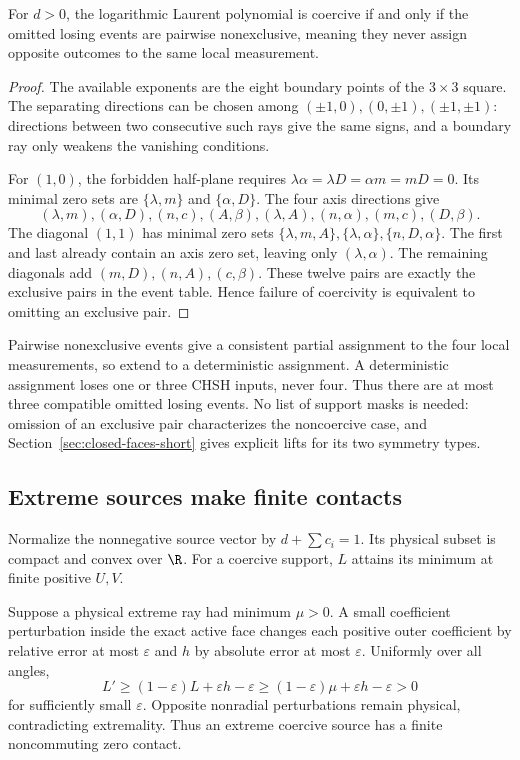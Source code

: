\begin{proposition}\label{prop:compat}
For $d>0$, the logarithmic Laurent polynomial is coercive if and only if the omitted losing events are pairwise nonexclusive, meaning they never assign opposite outcomes to the same local measurement.
\end{proposition}
\begin{proof}
The available exponents are the eight boundary points of the $3\times3$ square. The separating directions can be chosen among $(\pm1,0),(0,\pm1),(\pm1,\pm1)$: directions between two consecutive such rays give the same signs, and a boundary ray only weakens the vanishing conditions.

For $(1,0)$, the forbidden half-plane requires
$\lambda\alpha=\lambda D=\alpha m=mD=0$. Its minimal zero sets are $\{\lambda,m\}$ and $\{\alpha,D\}$. The four axis directions give
\[
(\lambda,m),(\alpha,D),(n,c),(A,\beta),
(\lambda,A),(n,\alpha),(m,c),(D,\beta).
\]
The diagonal $(1,1)$ has minimal zero sets
$\{\lambda,m,A\},\{\lambda,\alpha\},\{n,D,\alpha\}$.
The first and last already contain an axis zero set, leaving only $(\lambda,\alpha)$. The remaining diagonals add $(m,D),(n,A),(c,\beta)$. These twelve pairs are exactly the exclusive pairs in the event table. Hence failure of coercivity is equivalent to omitting an exclusive pair.
\end{proof}

Pairwise nonexclusive events give a consistent partial assignment to the four local measurements, so extend to a deterministic assignment. A deterministic assignment loses one or three CHSH inputs, never four. Thus there are at most three compatible omitted losing events. No list of support masks is needed: omission of an exclusive pair characterizes the noncoercive case, and Section~\ref{sec:closed-faces-short} gives explicit lifts for its two symmetry types.

\subsection{Extreme sources make finite contacts}
Normalize the nonnegative source vector by $d+\sum c_i=1$. Its physical subset is compact and convex over $\R$. For a coercive support, $L$ attains its minimum at finite positive $U,V$.

Suppose a physical extreme ray had minimum $\mu>0$. A small coefficient perturbation inside the exact active face changes each positive outer coefficient by relative error at most $\varepsilon$ and $h$ by absolute error at most $\varepsilon$. Uniformly over all angles,
\[L'\ge(1-\varepsilon)L+\varepsilon h-\varepsilon
\ge(1-\varepsilon)\mu+\varepsilon h-\varepsilon>0
\]
for sufficiently small $\varepsilon$. Opposite nonradial perturbations remain physical, contradicting extremality. Thus an extreme coercive source has a finite noncommuting zero contact.

